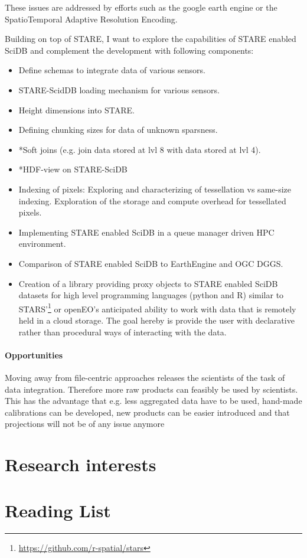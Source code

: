 \documentclass[a4paper,10pt]{article}
\begin{document}
These issues are addressed by efforts such as the google earth engine or the SpatioTemporal Adaptive Resolution Encoding. 

Building on top of STARE, I want to explore the capabilities of STARE enabled SciDB and complement the development with following components:

\begin{itemize}
 \item Define schemas to integrate data of various sensors.
 \item STARE-ScidDB loading mechanism for various sensors.
 \item Height dimensions into STARE.
 \item Defining chunking sizes for data of unknown sparsness.
 \item *Soft joins (e.g. join data stored at lvl 8 with data stored at lvl 4).
 \item *HDF-view on STARE-SciDB
 \item Indexing of pixels: Exploring and characterizing of tessellation vs same-size indexing. Exploration of the storage and compute overhead for tessellated pixels.
 \item Implementing STARE enabled SciDB in a queue manager driven HPC environment.
 \item Comparison of STARE enabled SciDB to EarthEngine and OGC DGGS.
 \item Creation of a library providing proxy objects to STARE enabled SciDB datasets for high level programming languages (python and R) similar to STARS'\footnote{\url{https://github.com/r-spatial/stars}} or openEO's anticipated ability to work with data that is remotely held in a cloud storage. The goal hereby is provide the user with declarative rather than procedural ways of interacting with the data. 
\end{itemize}

\paragraph{Opportunities}
Moving away from file-centric approaches releases the scientists of the task
of data integration. Therefore more raw products can feasibly be used by 
scientists. This has the advantage that e.g. less aggregated data have to be used,
hand-made calibrations can be developed, new products can be easier introduced and
that projections will not be of any issue anymore

\section{Research interests}

\section{Reading List}
\end{document}
